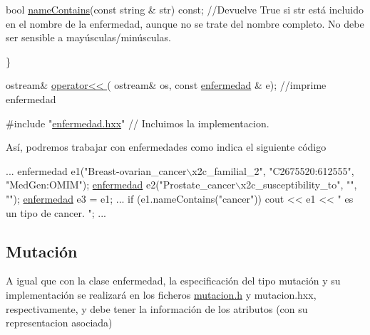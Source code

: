 \begin{DoxyCode}
 \textcolor{keywordtype}{bool} \hyperlink{classenfermedad_a94bbefdb18cb65627ceb39c18a6445e8}{nameContains}(\textcolor{keyword}{const} \textcolor{keywordtype}{string} & str) \textcolor{keyword}{const};   \textcolor{comment}{//Devuelve True si str está incluido en el
       nombre de la enfermedad, aunque no se trate del nombre completo. No debe ser sensible a mayúsculas/minúsculas. }

\}

 ostream& \hyperlink{enfermedad_8h_a38c12c8c3430c33f8280a6df23ac81a2}{operator<< }( ostream& os, \textcolor{keyword}{const} \hyperlink{classenfermedad}{enfermedad} & e); \textcolor{comment}{//imprime enfermedad }

\textcolor{preprocessor}{#include "\hyperlink{enfermedad_8hxx}{enfermedad.hxx}"} \textcolor{comment}{// Incluimos la implementacion.}
\end{DoxyCode}


Así, podremos trabajar con enfermedades como indica el siguiente código 
\begin{DoxyCode}
...
enfermedad e1(\textcolor{stringliteral}{"Breast-ovarian\_cancer\(\backslash\)x2c\_familial\_2"}, \textcolor{stringliteral}{"C2675520:612555"}, \textcolor{stringliteral}{"MedGen:OMIM"});
\hyperlink{classenfermedad}{enfermedad} e2(\textcolor{stringliteral}{"Prostate\_cancer\(\backslash\)x2c\_susceptibility\_to"}, \textcolor{stringliteral}{""}, \textcolor{stringliteral}{""});
\hyperlink{classenfermedad}{enfermedad} e3 = e1; 
...
if (e1.nameContains(\textcolor{stringliteral}{"cancer"})) 
  cout << e1 << \textcolor{stringliteral}{" es un tipo de cancer. "}; 
...
\end{DoxyCode}
\hypertarget{index_mutation}{}\subsection{Mutación}\label{index_mutation}
A igual que con la clase enfermedad, la especificación del tipo mutación y su implementación se realizará en los ficheros \hyperlink{mutacion_8h}{mutacion.\+h} y mutacion.\+hxx, respectivamente, y debe tener la información de los atributos (con su representacion asociada)

